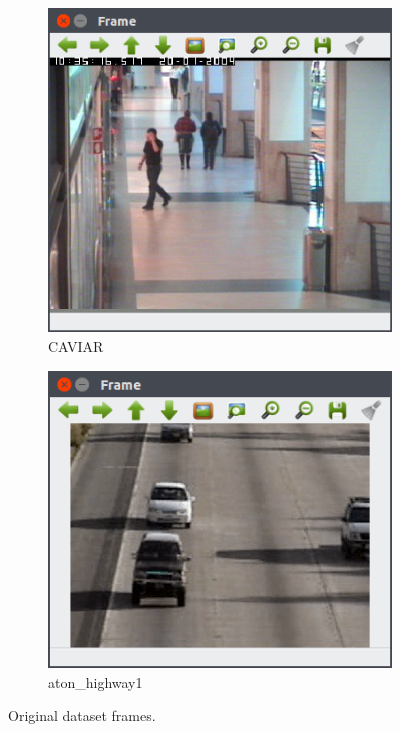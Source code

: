 \documentclass[12pt]{report}
\begin{document}
\begin{figure}
  \centering
  \begin{subfigure}{.45\linewidth}
    \includegraphics[width=1\linewidth]{figures/background/frame_caviar.png}
    \caption{CAVIAR}
  \end{subfigure}
  \hfill
  \begin{subfigure}{.49\linewidth}
    \includegraphics[width=1\linewidth]{figures/background/frame_highway1.png}
    \caption{aton\_highway1}
  \end{subfigure}
  \caption{Original dataset frames.}
\end{figure}
\end{document}
